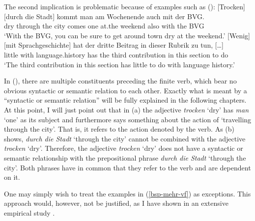 \pagebreak
The second implication is problematic because of examples such as ():
\eal
\label{bsp-mehr-vf}
\ex\label{bsp-trocken-durch-die-stadt}
\gll {}[Trocken] [durch die Stadt] kommt man am Wochenende auch mit der BVG.\footnotemark\\
	 \spacebr{}dry \spacebr{}through the city comes one at.the weekend also with the BVG\\
\glt `With the BVG, you can be sure to get around town dry at the weekend.'
\ex 
\gll {}[Wenig] [mit Sprachgeschichte] hat der dritte Beitrag in dieser Rubrik zu tun, [\ldots]\footnotemark\\
       \spacebr{}little \spacebr{}with language.history has the third contribution in this section to do\\
\glt `The third contribution in this section has little to do with language history.'
\zl

\noindent
In (), there are multiple constituents preceding the finite verb, which bear no obvious syntactic or
semantic relation to each other. Exactly what is meant by a ``syntactic or semantic relation'' will be fully
explained in the following chapters. At this point, I will just point out that in (a) the adjective 
\emph{trocken} `dry' has \emph{man} `one' as its subject and furthermore says something about the
action of `travelling through the city'. That is, it refers to the action denoted by the verb. As (b) shows,
\emph{durch die Stadt} `through the city' cannot be combined with the adjective \emph{trocken}
`dry'.
\eal
{}
\zl
Therefore, the adjective \emph{trocken} `dry' does not have a syntactic or semantic relationship with the prepositional
phrase \emph{durch die Stadt} `through the city'. Both phrases have in common that they refer to the verb and are dependent on it.


One may simply wish to treat the examples in (\ref{bsp-mehr-vf}) as exceptions. This approach would,
however, not be justified, as I have shown in an extensive empirical study \citep{Mueller2003b}.

